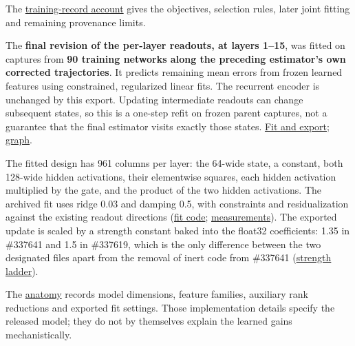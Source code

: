 \documentclass[11pt,letterpaper]{article}
\begin{document}
The \href{https://github.com/mattliston/arc-whitebox-estimation-challenge/blob/main/estimator/ANATOMY.md\#training-records-and-provenance-limits}{training-record account} gives the objectives, selection rules, later joint fitting and remaining provenance limits.

The \textbf{final revision of the per-layer readouts, at layers 1--15}, was fitted on captures from \textbf{90 training networks along the preceding estimator's own corrected trajectories}. It predicts remaining mean errors from frozen learned features using constrained, regularized linear fits. The recurrent encoder is unchanged by this export. Updating intermediate readouts can change subsequent states, so this is a one-step refit on frozen parent captures, not a guarantee that the final estimator visits exactly those states. \href{https://github.com/mattliston/arc-whitebox-estimation-challenge/blob/main/estimator/ANATOMY.md\#on-policy-linear-readout}{Fit and export}; \href{https://mattliston.github.io/arc-whitebox-estimation-challenge/\#node=build-fit&view=map}{graph}.

The fitted design has 961 columns per layer: the 64-wide state, a constant, both 128-wide hidden activations, their elementwise squares, each hidden activation multiplied by the gate, and the product of the two hidden activations. The archived fit uses ridge 0.03 and damping 0.5, with constraints and residualization against the existing readout directions (\href{https://github.com/mattliston/arc-whitebox-estimation-challenge/blob/main/release/common/readout/fit_blocks_full90_v1.py}{fit code}; \href{https://github.com/mattliston/arc-whitebox-estimation-challenge/blob/main/experiments/on-policy-readout/961-column-readout-cap-4-size-threshold-0-620/README.md}{measurements}). The exported update is scaled by a strength constant baked into the float32 coefficients: 1.35 in \#337641 and 1.5 in \#337619, which is the only difference between the two designated files apart from the removal of inert code from \#337641 (\href{https://github.com/mattliston/arc-whitebox-estimation-challenge/blob/main/experiments/on-policy-readout/final-readout-strength-1-35-improves-mac-linux-panels/README.md}{strength ladder}).

The \href{https://github.com/mattliston/arc-whitebox-estimation-challenge/blob/main/estimator/ANATOMY.md\#learned-mean-and-covariance-corrections}{anatomy} records model dimensions, feature families, auxiliary rank reductions and exported fit settings. Those implementation details specify the released model; they do not by themselves explain the learned gains mechanistically.
\end{document}
